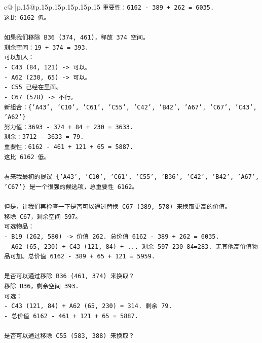 \documentclass{article}
\begin{document}
{\begin{supertabular}{c@{$\;$}|p{.15\linewidth}@{}p{.15\linewidth}p{.15\linewidth}p{.15\linewidth}p{.15\linewidth}p{.15\linewidth}}
{{{\texttt{重要性：6162 {-} 389 + 262 = 6035.} \\
\texttt{这比 6162 低。} \\
\\ 
\texttt{如果我们移除 B36 (374, 461)，释放 374 空间。} \\
\texttt{剩余空间：19 + 374 = 393.} \\
\texttt{可以加入：} \\
\texttt{{-} C43 (84, 121) {-}> 可以。} \\
\texttt{{-} A62 (230, 65) {-}> 可以。} \\
\texttt{{-} C55 已经在里面。} \\
\texttt{{-} C67 (578) {-}> 不行。} \\
\texttt{新组合：\{'A43', 'C10', 'C61', 'C55', 'C42', 'B42', 'A67', 'C67', 'C43', 'A62'\}} \\
\texttt{努力值：3693 {-} 374 + 84 + 230 = 3633.} \\
\texttt{剩余：3712 {-} 3633 = 79.} \\
\texttt{重要性：6162 {-} 461 + 121 + 65 = 5887.} \\
\texttt{这比 6162 低。} \\
\\ 
\texttt{看来我最初的提议 \{'A43', 'C10', 'C61', 'C55', 'B36', 'C42', 'B42', 'A67', 'C67'\} 是一个很强的候选项，总重要性 6162。} \\
\\ 
\texttt{但是，让我们再检查一下是否可以通过替换 C67 (389, 578) 来换取更高的价值。} \\
\texttt{移除 C67，剩余空间 597。} \\
\texttt{可选物品：} \\
\texttt{{-} B19 (262, 580) {-}> 价值 262. 总价值 6162 {-} 389 + 262 = 6035.} \\
\texttt{{-} A62 (65, 230) + C43 (121, 84) + ... 剩余 597{-}230{-}84=283. 无其他高价值物品可加。总价值 6162 {-} 389 + 65 + 121 = 5959.} \\
\\ 
\texttt{是否可以通过移除 B36 (461, 374) 来换取？} \\
\texttt{移除 B36，剩余空间 393.} \\
\texttt{可选：} \\
\texttt{{-} C43 (121, 84) + A62 (65, 230) = 314. 剩余 79.} \\
\texttt{{-} 总价值 6162 {-} 461 + 121 + 65 = 5887.} \\
\\ 
\texttt{是否可以通过移除 C55 (583, 388) 来换取？} \\
}}}
\end{supertabular}}
\end{document}
